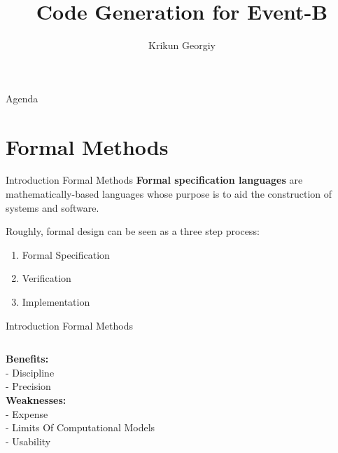 \documentclass{beamer}
\title{Code Generation for Event-B}
\date{}
\author{Krikun Georgiy}
\institute{Innopolis University}
\begin{document}
  \maketitle

  \begin{frame}{Agenda}
    \tableofcontents
  \end{frame}

  \section{Formal Methods}

  \begin{frame}{Introduction Formal Methods}
    \textbf{Formal specification languages} are mathematically-based languages whose
    purpose is to aid the construction of systems and software. 



    Roughly, formal design can be seen as a three step process:\\
    \begin{enumerate}
      \item Formal Specification
      \item Verification
      \item Implementation
    \end{enumerate}
    

  \end{frame}

  \begin{frame}{Introduction Formal Methods}
    \begin{columns}
        \textbf{Benefits:}\\
        - Discipline\\
        - Precision\\
        \textbf{Weaknesses:}\\
        - Expense\\
        - Limits Of Computational Models\\
        - Usability\\
    \end{columns}

    \end{frame}
\end{document}

